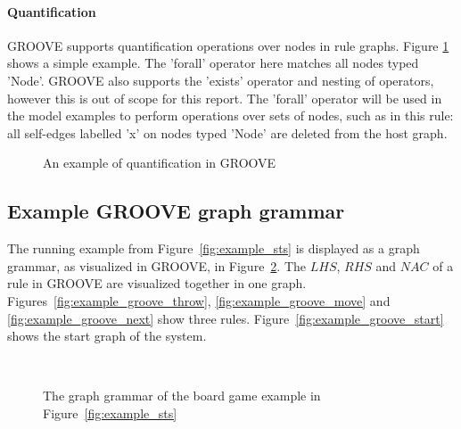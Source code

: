 \paragraph*{Quantification}
GROOVE supports quantification operations over nodes in rule graphs. Figure \ref{fig:quantification} shows a simple example. The 'forall' operator here matches all nodes typed 'Node'. GROOVE also supports the 'exists' operator and nesting of operators, however this is out of scope for this report. The 'forall' operator will be used in the model examples to perform operations over sets of nodes, such as in this rule: all self-edges labelled 'x' on nodes typed 'Node' are deleted from the host graph. 

\begin{figure}[h]
  \begin{center}
    
  \end{center}
  \caption{An example of quantification in GROOVE}
  \label{fig:quantification}
\end{figure}

\subsection{Example GROOVE graph grammar}\label{sec:example_groove} 
The running example from Figure~\ref{fig:example_sts} is displayed as a graph grammar, as visualized in GROOVE, in Figure~\ref{fig:example_groove}. The $\mathit{LHS}$, $\mathit{RHS}$ and $\mathit{NAC}$ of a rule in GROOVE are visualized together in one graph. Figures~\ref{fig:example_groove_throw}, \ref{fig:example_groove_move} and \ref{fig:example_groove_next} show three rules. Figure~\ref{fig:example_groove_start} shows the start graph of the system.

\begin{figure}[h]
  \begin{center}
    \quad \\
    \hspace{10px}
    \hspace{10px}
  \end{center}
  \caption{The graph grammar of the board game example in Figure~\ref{fig:example_sts}}
  \label{fig:example_groove}
\end{figure}

